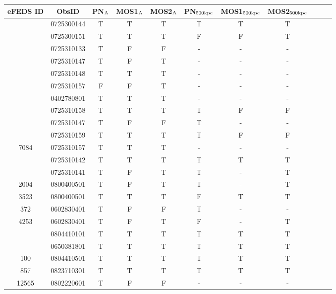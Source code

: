 \documentclass[fleqn,usenatbib]{mnras}
\begin{document}
\begin{table}
\begin{center}
\contcaption{{}}
\vspace{1mm}
\begin{tabular}{ccccccccccc}
\hline
\hline
eFEDS ID & ObsID & PN$_{\rm{A}}$ & MOS1$_{\rm{A}}$ & MOS2$_{\rm{A}}$ & PN$_{\rm{500kpc}}$ & MOS1$_{\rm{500kpc}}$ & MOS2$_{\rm{500kpc}}$\\
\hline
\hline
\multirow{2}{4em}{\centering 3259} & 0725300144 & T & T & T & T & T & T \\ & 0725300151 & T & T & T & F & F & T \\ 
\hline
\multirow{5}{4em}{\centering 7086} & 0725310133 & T & F & F & - & - & - \\ & 0725310147 & T & F & T & - & - & - \\ & 0725310148 & T & T & T & - & - & - \\ & 0725310157 & F & F & T & - & - & - \\ & 0402780801 & T & T & T & - & - & - \\ 
\hline
\multirow{3}{4em}{\centering 5219} & 0725310158 & T & T & T & T & F & F \\ & 0725310147 & T & F & F & T & - & - \\ & 0725310159 & T & T & T & T & F & F \\ 
\hline
7084 & 0725310157 & T & T & T & - & - & - \\ 
\hline
\multirow{2}{4em}{\centering 885} & 0725310142 & T & T & T & T & T & T \\ & 0725310141 & T & F & T & T & - & T \\ 
\hline
2004 & 0800400501 & T & F & T & T & - & T \\ 
\hline
3523 & 0800400501 & T & T & T & F & T & T \\ 
\hline
372 & 0602830401 & T & F & F & T & - & - \\ 
\hline
4253 & 0602830401 & T & F & T & F & - & T \\ 
\hline
\multirow{2}{4em}{\centering 534} & 0804410101 & T & T & T & T & T & T \\ & 0650381801 & T & T & T & T & T & T \\ 
\hline
100 & 0804410501 & T & T & T & T & T & T \\ 
\hline
857 & 0823710301 & T & T & T & T & T & T \\ 
\hline
12565 & 0802220601 & T & F & F & - & - & - \\ 
\hline
\end{tabular}
\end{center}
\end{table}
\end{document}
